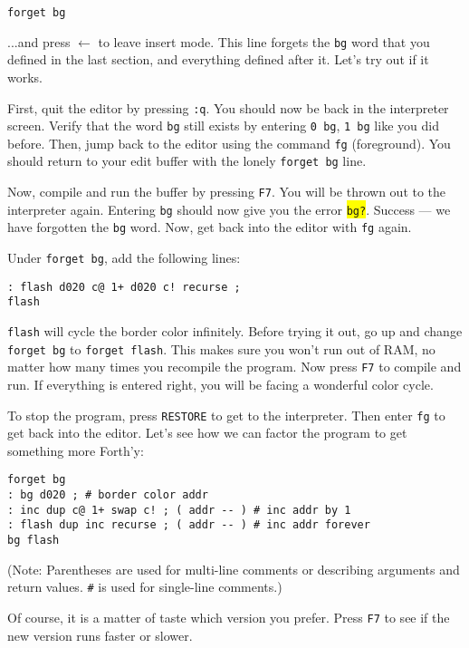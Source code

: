 \begin{verbatim}
forget bg
\end{verbatim}

...and press $\leftarrow$ to leave insert mode. This line forgets the \texttt{bg} word that you defined in the last section, and everything defined after it. Let's try out if it works.

First, quit the editor by pressing \texttt{:q}. You should now be back in the interpreter screen. Verify that the word \texttt{bg} still exists by  entering \texttt{0 bg}, \texttt{1 bg} like you did before. Then, jump back to the editor using the command \texttt{fg} (foreground). You should return to your edit buffer with the lonely \texttt{forget bg} line.

Now, compile and run the buffer by pressing \texttt{F7}. You will be thrown out to the interpreter again. Entering \texttt{bg} should now give you the error \colorbox{yellow}{\texttt{bg?}}. Success --- we have forgotten the \texttt{bg} word. Now, get back into the editor with \texttt{fg} again.

Under \texttt{forget bg}, add the following lines:

\begin{verbatim}
: flash d020 c@ 1+ d020 c! recurse ;
flash
\end{verbatim}

\texttt{flash} will cycle the border color infinitely. Before trying it out, go up and change \texttt{forget bg} to \texttt{forget flash}. This makes sure you won't run out of RAM, no matter how many times you recompile the program. Now press \texttt{F7} to compile and run. If everything is entered right, you will be facing a wonderful color cycle.

To stop the program, press \texttt{RESTORE} to get to the interpreter. Then enter \texttt{fg} to get back into the editor. Let's see how we can factor the program to get something more Forth'y:

\begin{verbatim}
forget bg
: bg d020 ; # border color addr
: inc dup c@ 1+ swap c! ; ( addr -- ) # inc addr by 1
: flash dup inc recurse ; ( addr -- ) # inc addr forever
bg flash
\end{verbatim}

(Note: Parentheses are used for multi-line comments or describing arguments and return values. \texttt{\#} is used for single-line comments.)

Of course, it is a matter of taste which version you prefer. Press \texttt{F7} to see if the new version runs faster or slower.

